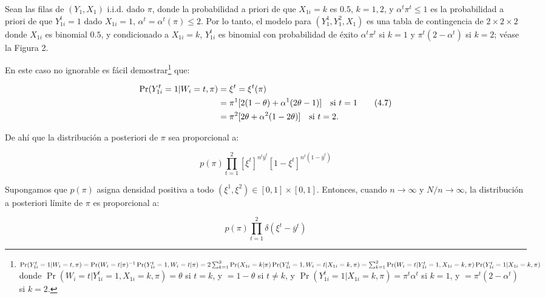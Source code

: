 \documentclass[12pt,a4paper]{article}
\begin{document}
Sean las filas de $(Y_1, X_1)$ i.i.d. dado $\pi$, donde la probabilidad a priori de que $X_{1i}=k$ es $0.5$, $k=1,2$, y $\alpha^t\pi^t \le 1$ es la probabilidad a priori de que $Y_{1i}^t=1$ dado $X_{1i}=1$, $\alpha^t = \alpha^t(\pi) \le 2$. Por lo tanto, el modelo para $(Y_1^1, Y_1^2, X_1)$ es una tabla de contingencia de $2 \times 2 \times 2$ donde $X_{1i}$ es binomial $0.5$, y condicionado a $X_{1i}=k$, $Y_{1i}^t$ es binomial con probabilidad de éxito $\alpha^t\pi^t$ si $k=1$ y $\pi^t(2-\alpha^t)$ si $k=2$; véase la Figura 2.

En este caso no ignorable es fácil demostrar\footnote{
$\operatorname{Pr}(Y_{1i}^t=1 | W_i=t, \pi) = \operatorname{Pr}(W_i=t | \pi)^{-1} \operatorname{Pr}(Y_{1i}^t=1, W_i=t | \pi) \\
= 2 \sum_{k=1}^2 \operatorname{Pr}(X_{1i}=k | \pi) \operatorname{Pr}(Y_{1i}^t=1, W_i=t | X_{1i}=k, \pi) \\
= \sum_{k=1}^2 \operatorname{Pr}(W_i=t | Y_{1i}^t=1, X_{1i}=k, \pi) \operatorname{Pr}(Y_{1i}^t=1 | X_{1i}=k, \pi) \\$
donde $\operatorname{Pr}(W_i=t | Y_{1i}^t=1, X_{1i}=k, \pi) = \theta$ si $t=k$, y $= 1-\theta$ si $t \ne k$, 
y $\operatorname{Pr}(Y_{1i}^t=1 | X_{1i}=k, \pi) = \pi^t\alpha^t$ si $k=1$, y $= \pi^t(2-\alpha^t)$ si $k=2$.
} que:

\begin{align}\label{eq:4.7}
\operatorname{Pr}(Y_{1i}^t=1 | W_i=t, \pi) &= \xi^t = \xi^t(\pi) \notag\\
&= \pi^1[2(1-\theta) + \alpha^1(2\theta-1)] \quad \text{si } t=1 \tag{4.7}\\
&= \pi^2[2\theta + \alpha^2(1-2\theta)] \quad \text{si } t=2. \notag
\end{align}

De ahí que la distribución a posteriori de $\pi$ sea proporcional a:

\begin{equation}\label{eq:4.8}
p(\pi) \prod_{t=1}^2 [\xi^t]^{n^t \overline{y}^t} [1-\xi^t]^{n^t(1-\overline{y}^t)} \tag{4.8}
\end{equation}

Supongamos que $p(\pi)$ asigna densidad positiva a todo $(\xi^1, \xi^2) \in [0,1] \times [0,1]$. Entonces, cuando $n \rightarrow \infty$ y $N/n \rightarrow \infty$, la distribución a posteriori límite de $\pi$ es proporcional a:

\begin{equation}\label{eq:4.9}
p(\pi) \prod_{t=1}^2 \delta(\xi^t - \overline{y}^t) \tag{4.9}
\end{equation}
\end{document}
